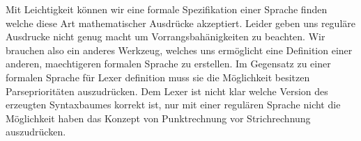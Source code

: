 \documentclass[a4paper, 12pt]{article}
\begin{document}
Mit Leichtigkeit k\"onnen wir eine formale Spezifikation einer Sprache finden
welche diese Art mathematischer Ausdr\"ucke akzeptiert. Leider geben uns regul\"are Ausdrucke nicht genug macht um Vorrangsbah\"anigkeiten zu beachten.
Wir brauchen also ein anderes Werkzeug, welches uns erm\"oglicht eine Definition
einer anderen, maechtigeren formalen Sprache zu erstellen. Im Gegensatz zu einer formalen Sprache
f\"ur Lexer definition muss sie die M\"oglichkeit besitzen Parsepriorit\"aten auszudr\"ucken.
Dem Lexer ist nicht klar welche Version des erzeugten Syntaxbaumes korrekt ist, nur mit einer regul\"aren Sprache nicht die M\"oglichkeit haben das Konzept von Punktrechnung vor Strichrechnung auszudr\"ucken.
\begin{figure}[h]
    \centering
    \qquad
    \label{fig:vs}%
\end{figure}
\end{document}
